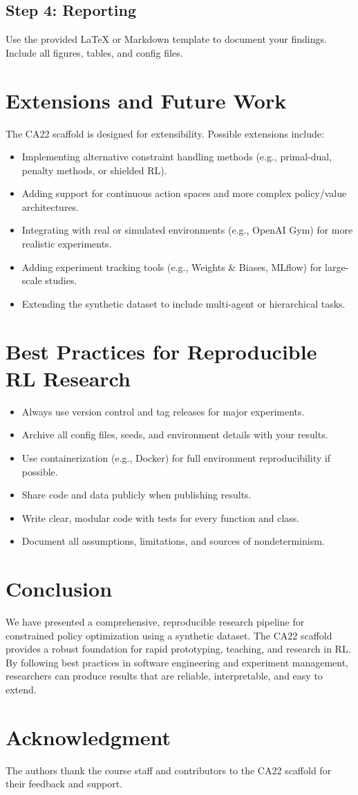 \documentclass[conference]{IEEEtran}
\begin{document}
\subsection{Step 4: Reporting}
Use the provided LaTeX or Markdown template to document your findings. Include all figures, tables, and config files.

\section{Extensions and Future Work}
The CA22 scaffold is designed for extensibility. Possible extensions include:
\begin{itemize}
  \item Implementing alternative constraint handling methods (e.g., primal-dual, penalty methods, or shielded RL).
  \item Adding support for continuous action spaces and more complex policy/value architectures.
  \item Integrating with real or simulated environments (e.g., OpenAI Gym) for more realistic experiments.
  \item Adding experiment tracking tools (e.g., Weights \& Biases, MLflow) for large-scale studies.
  \item Extending the synthetic dataset to include multi-agent or hierarchical tasks.
\end{itemize}

\section{Best Practices for Reproducible RL Research}
\begin{itemize}
  \item Always use version control and tag releases for major experiments.
  \item Archive all config files, seeds, and environment details with your results.
  \item Use containerization (e.g., Docker) for full environment reproducibility if possible.
  \item Share code and data publicly when publishing results.
  \item Write clear, modular code with tests for every function and class.
  \item Document all assumptions, limitations, and sources of nondeterminism.
\end{itemize}

\section{Conclusion}
We have presented a comprehensive, reproducible research pipeline for constrained policy optimization using a synthetic dataset. The CA22 scaffold provides a robust foundation for rapid prototyping, teaching, and research in RL. By following best practices in software engineering and experiment management, researchers can produce results that are reliable, interpretable, and easy to extend.

\section*{Acknowledgment}
The authors thank the course staff and contributors to the CA22 scaffold for their feedback and support.



\end{document}

